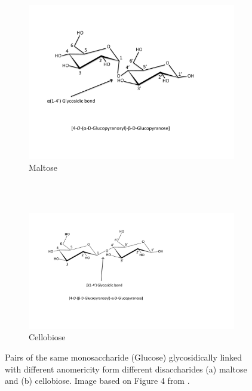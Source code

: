 \documentclass[12pt,a4paper]{article}
\begin{document}
\begin{figure}[ht!]
    \centering
    \begin{subfigure}[t]{1.0\textwidth}
        \centering
        \includegraphics[scale=0.55]{images/glycosidic_linkage_maltose.pdf}
        \caption{Maltose}
    \end{subfigure}%
    \\
    \bigbreak
    ~ 
	\\
    \begin{subfigure}[t]{1.0\textwidth}
        \centering
        \includegraphics[scale=0.55]{images/glycosidic_linkage_cellobiose.pdf}
        \caption{Cellobiose}
    \end{subfigure}
    \caption{Pairs of the same monosaccharide (Glucose) glycosidically linked with different anomericity form different disaccharides (a) maltose and (b) cellobiose. Image based on Figure 4 from \citep{SONG2012137}.}
\label{fig:glycosidic_linkage}
\end{figure}
\end{document}
